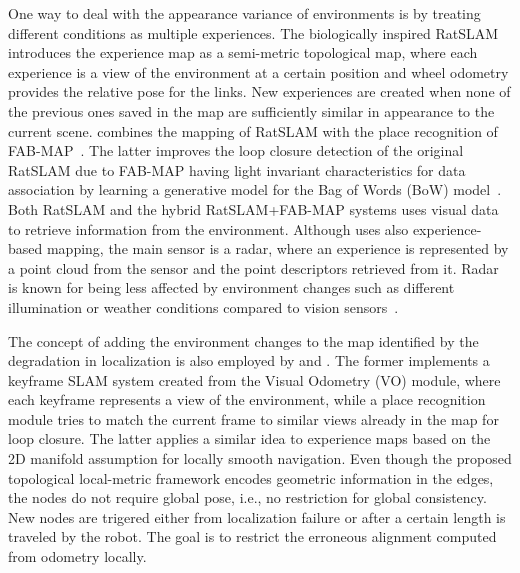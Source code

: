One way to deal with the appearance variance of environments is by treating different conditions as multiple experiences.
The biologically inspired RatSLAM~\parencite{ball-et-al:2013:9} introduces the experience map as a semi-metric topological map, where each experience is a view of the environment at a certain position and wheel odometry provides the relative pose for the links. New experiences are created when none of the previous ones saved in the map are sufficiently similar in appearance to the current scene.
\cite{glover-et-al:2010:5509547} combines the mapping of RatSLAM with the place recognition of FAB-MAP~\parencite{discussion:fab-map}. The latter improves the loop closure detection of the original RatSLAM due to FAB-MAP having light invariant characteristics for data association by learning a generative model for the Bag of Words (BoW) model~\parencite{discussion:bow}.
Both RatSLAM and the hybrid RatSLAM+FAB-MAP systems uses visual data to retrieve information from the environment.
Although \cite{martini-et-al:2020:s20216002} uses also experience-based mapping, the main sensor is a radar, where an experience is represented by a point cloud from the sensor and the point descriptors retrieved from it. Radar is known for being less affected by environment changes such as different illumination or weather conditions compared to vision sensors~\parencite{hong-et-al:2022:02783649221080483}.

The concept of adding the environment changes to the map identified by the degradation in localization is also employed by \cite{konolige-bowman:2009:5354121} and \cite{tang-et-al:2019:7}.
The former implements a keyframe SLAM system created from the Visual Odometry (VO) module, where each keyframe represents a view of the environment, while a place recognition module tries to match the current frame to similar views already in the map for loop closure.
The latter applies a similar idea to experience maps based on the 2D manifold assumption for locally smooth navigation. Even though the proposed topological local-metric framework encodes geometric information in the edges, the nodes do not require global pose, i.e., no restriction for global consistency. New nodes are trigered either from localization failure or after a certain length is traveled by the robot. The goal is to restrict the erroneous alignment computed from odometry locally.


